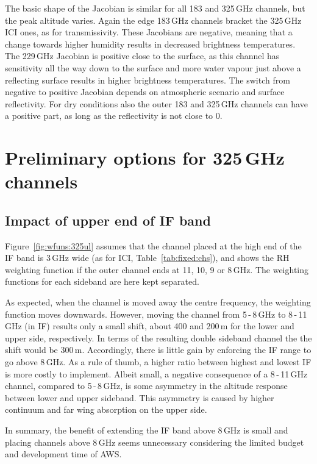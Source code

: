 \documentclass[12pt]{article}
\begin{document}
The basic shape of the Jacobian is similar for all 183 and 325\,GHz channels,
but the peak altitude varies. Again the edge 183\,GHz channels bracket the
325\,GHz ICI ones, as for transmissivity. These Jacobians are negative, meaning
that a change towards higher humidity results in decreased brightness
temperatures. The 229\,GHz Jacobian is positive close to the surface, as this
channel has sensitivity all the way down to the surface and more water vapour
just above a reflecting surface results in higher brightness temperatures. The
switch from negative to positive Jacobian depends on atmospheric scenario and
surface reflectivity. For dry conditions also the outer 183 and 325\,GHz
channels can have a positive part, as long as the reflectivity is not close to
0.


\section{Preliminary options for 325\,GHz channels}

\label{sec:channel:configurations}

\subsection{Impact of upper end of IF band}
%
Figure~\ref{fig:wfuns:325ul} assumes that the channel placed at the high end of
the IF band is 3\,GHz wide (as for ICI, Table~\ref{tab:fixed:chs}), and shows
the RH weighting function if the outer channel ends at 11, 10, 9 or 8\,GHz. The
weighting functions for each sideband are here kept separated.


As expected, when the channel is moved away the centre frequency, the weighting
function moves downwards. However, moving the channel from 5\,-\,8\,GHz to
8\,-\,11\,GHz (in IF) results only a small shift, about 400 and 200\,m for the
lower and upper side, respectively. In terms of the resulting double sideband
channel the the shift would be 300\,m. Accordingly, there is little gain by
enforcing the IF range to go above 8\,GHz. As a rule of thumb, a higher ratio
between highest and lowest IF is more costly to implement. Albeit small, a
negative consequence of a 8\,-\,11\,GHz channel, compared to 5\,-\,8\,GHz, is
some asymmetry in the altitude response between lower and upper sideband. This
asymmetry is caused by higher continuum and far wing absorption on the upper
side.

In summary, the benefit of extending the IF band above 8\,GHz is small and
placing channels above 8\,GHz seems unnecessary considering the limited budget
and development time of AWS.
\end{document}
